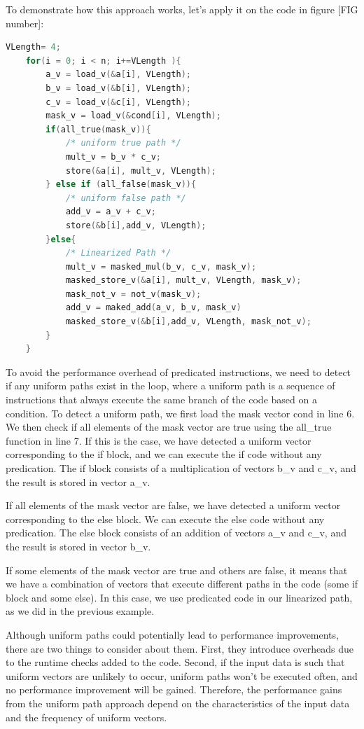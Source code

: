 \documentclass[\main/thesis.tex]{subfiles}
\begin{document}
To demonstrate how this approach works, let's apply it on the code in figure [FIG number]:

\begin{lstlisting}[language=C]
    VLength= 4;
    for(i = 0; i < n; i+=VLength ){
        a_v = load_v(&a[i], VLength);
        b_v = load_v(&b[i], VLength);
        c_v = load_v(&c[i], VLength);
        mask_v = load_v(&cond[i], VLength);
        if(all_true(mask_v)){
            /* uniform true path */
            mult_v = b_v * c_v;
            store(&a[i], mult_v, VLength);
        } else if (all_false(mask_v)){
            /* uniform false path */
            add_v = a_v + c_v;
            store(&b[i],add_v, VLength);
        }else{
            /* Linearized Path */
            mult_v = masked_mul(b_v, c_v, mask_v);
            masked_store_v(&a[i], mult_v, VLength, mask_v);
            mask_not_v = not_v(mask_v);
            add_v = maked_add(a_v, b_v, mask_v)
            masked_store_v(&b[i],add_v, VLength, mask_not_v);
        }
    }
\end{lstlisting}

To avoid the performance overhead of predicated instructions, we need to detect if any uniform paths exist in the loop, where a uniform path is a sequence of instructions that always execute the same branch of the code based on a condition. To detect a uniform path, we first load the mask vector cond in line 6. We then check if all elements of the mask vector are true using the all\_true function in line 7. If this is the case, we have detected a uniform vector corresponding to the if block, and we can execute the if code without any predication. The if block consists of a multiplication of vectors b\_v and c\_v, and the result is stored in vector a\_v.

If all elements of the mask vector are false, we have detected a uniform vector corresponding to the else block. We can execute the else code without any predication. The else block consists of an addition of vectors a\_v and c\_v, and the result is stored in vector b\_v.

If some elements of the mask vector are true and others are false, it means that we have a combination of vectors that execute different paths in the code (some if block and some else). In this case, we use predicated code in our linearized path, as we did in the previous example.

Although uniform paths could potentially lead to performance improvements, there are two things to consider about them. First, they introduce overheads due to the runtime checks added to the code. Second, if the input data is such that uniform vectors are unlikely to occur, uniform paths won't be executed often, and no performance improvement will be gained. Therefore, the performance gains from the uniform path approach depend on the characteristics of the input data and the frequency of uniform vectors.
\end{document}
